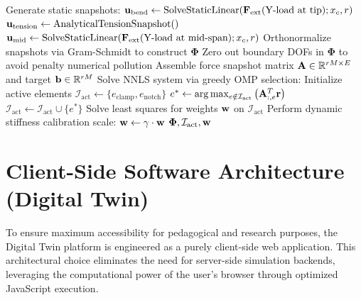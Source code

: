 \begin{algorithm}[htbp]
\caption{Offline ECSW Training and Reduced Basis Generation}
\label{alg:ecsw_training}
\begin{algorithmic}[1]
    \State Generate static snapshots:
    \State $\mathbf{u}_{\text{bend}} \gets \text{SolveStaticLinear}(\mathbf{F}_{\text{ext}}(\text{Y-load at tip}); x_c, r)$
    \State $\mathbf{u}_{\text{tension}} \gets \text{AnalyticalTensionSnapshot}()$
    \State $\mathbf{u}_{\text{mid}} \gets \text{SolveStaticLinear}(\mathbf{F}_{\text{ext}}(\text{Y-load at mid-span}); x_c, r)$
    \State Orthonormalize snapshots via Gram-Schmidt to construct $\boldsymbol{\Phi}$
    \State Zero out boundary DOFs in $\boldsymbol{\Phi}$ to avoid penalty numerical pollution
    \State Assemble force snapshot matrix $\mathbf{A} \in \mathbb{R}^{rM \times E}$ and target $\mathbf{b} \in \mathbb{R}^{rM}$
    \State Solve NNLS system via greedy OMP selection:
    \State Initialize active elements $\mathcal{I}_{\text{act}} \gets \{e_{\text{clamp}}, e_{\text{notch}}\}$
        \State $e^* \gets \arg\max_{e \notin \mathcal{I}_{\text{act}}} \left( \mathbf{A}_{:, e}^T \mathbf{r} \right)$
        \State $\mathcal{I}_{\text{act}} \gets \mathcal{I}_{\text{act}} \cup \{e^*\}$
        \State Solve least squares for weights $\mathbf{w}$ on $\mathcal{I}_{\text{act}}$
    \EndWhile
    \State Perform dynamic stiffness calibration scale: $\mathbf{w} \gets \gamma \cdot \mathbf{w}$
    \State \Return $\boldsymbol{\Phi}, \mathcal{I}_{\text{act}}, \mathbf{w}$
\EndProcedure
\end{algorithmic}
\end{algorithm}
\section{Client-Side Software Architecture (Digital Twin)} \label{sec:mvc}
To ensure maximum accessibility for pedagogical and research purposes, the Digital Twin platform is engineered as a purely client-side web application. This architectural choice eliminates the need for server-side simulation backends, leveraging the computational power of the user's browser through optimized JavaScript execution.

